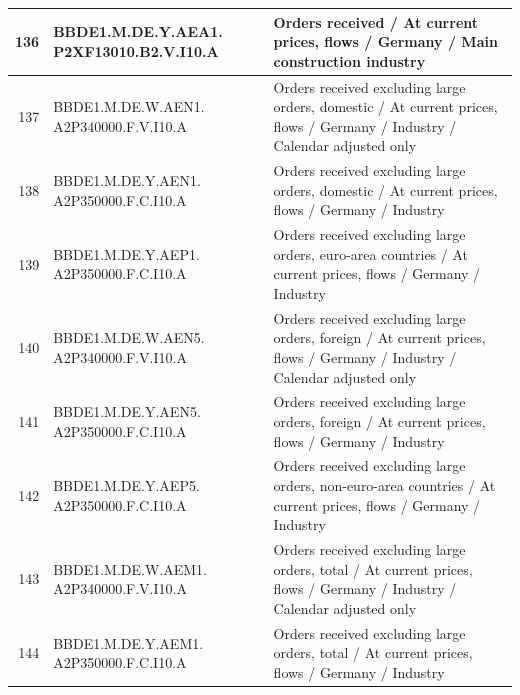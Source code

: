 \documentclass[11pt]{article}
\begin{document}
\begin{table}
\begin{tabular}{rp{5cm}p{11cm}}
  \hline
  136 & BBDE1.M.DE.Y.AEA1. P2XF13010.B2.V.I10.A & Orders received / At current prices, flows / Germany / Main construction industry \\ 
  \hline
  137 & BBDE1.M.DE.W.AEN1. A2P340000.F.V.I10.A & Orders received excluding large orders, domestic / At current prices, flows / Germany / Industry / Calendar adjusted only \\ 
  \hline
  138 & BBDE1.M.DE.Y.AEN1. A2P350000.F.C.I10.A & Orders received excluding large orders, domestic / At current prices, flows / Germany / Industry  \\ 
  \hline
  139 & BBDE1.M.DE.Y.AEP1. A2P350000.F.C.I10.A & Orders received excluding large orders, euro-area countries / At current prices, flows / Germany / Industry \\ 
  \hline
  140 & BBDE1.M.DE.W.AEN5. A2P340000.F.V.I10.A & Orders received excluding large orders, foreign / At current prices, flows / Germany / Industry / Calendar adjusted only \\ 
  \hline
  141 & BBDE1.M.DE.Y.AEN5. A2P350000.F.C.I10.A & Orders received excluding large orders, foreign / At current prices, flows / Germany / Industry \\ 
  \hline
  142 & BBDE1.M.DE.Y.AEP5. A2P350000.F.C.I10.A & Orders received excluding large orders, non-euro-area countries / At current prices, flows / Germany / Industry \\ 
  \hline
  143 & BBDE1.M.DE.W.AEM1. A2P340000.F.V.I10.A & Orders received excluding large orders, total / At current prices, flows / Germany / Industry / Calendar adjusted only \\ 
  \hline
  144 & BBDE1.M.DE.Y.AEM1. A2P350000.F.C.I10.A & Orders received excluding large orders, total / At current prices, flows / Germany / Industry \\ 

\end{tabular}
\end{table}
\end{document}
